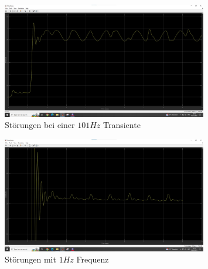 \documentclass[a4paper]{article}
\begin{document}
\begin{figure}[h]
    \centering
    \includegraphics[width=0.8\textwidth]{images/6.3.6)101hz.jpg}
    \caption{Störungen bei einer $101\unit{Hz}$ Transiente}
    \label{fig:images-6-3-6-101hz-jpg}
\end{figure}

\begin{figure}[h]
    \centering
    \includegraphics[width=0.8\textwidth]{images/6.3.6)22hz.jpg}
    \caption{Störungen mit $1\unit{Hz}$ Frequenz}
    \label{fig:images-6-3-6-22hz-jpg}
\end{figure}
\end{document}
